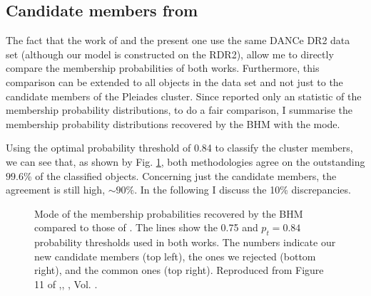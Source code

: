 \subsection{Candidate members from \citet{Bouy2015}}
\label{sect:comparisonBouy}

The fact that the work of \citet{Bouy2015} and the present one use the same DANCe DR2 data set (although our model is constructed on the RDR2), allow me to directly compare the membership probabilities of both works. Furthermore, this comparison can be extended to all objects in the data set and not just to the candidate members of the Pleiades cluster. Since \citet{Bouy2015} reported only an statistic of the membership probability distributions, to do a fair comparison, I summarise the membership probability distributions recovered by the BHM with the mode.

Using the optimal probability threshold of 0.84 to classify the cluster members, we can see that, as shown by Fig. \ref{fig:BHMBouy}, both methodologies agree on the outstanding $99.6$\% of the classified objects. Concerning just the candidate members, the agreement is still high, $\sim 90\%$. In the following I discuss the 10\% discrepancies.

\begin{figure}[ht!]
\begin{center}
\caption{Mode of the membership probabilities recovered by the BHM compared to those of \citet{Bouy2015}. The lines show the 0.75 and $p_t=0.84$ probability thresholds used in both works. The numbers indicate our new candidate members (top left), the ones we rejected (bottom right), and the common ones (top right). Reproduced from Figure 11 of \citet{Olivares2017},\textit{}, , Vol. .}
\label{fig:BHMBouy}
\end{center}
\end{figure}

